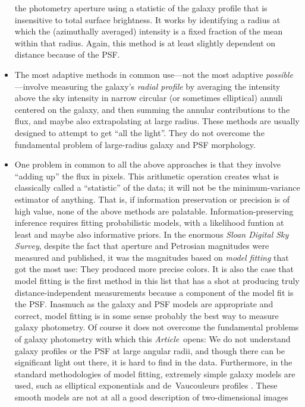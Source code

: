 \documentclass[12pt,preprint,pdftex]{aastex}
\newcommand{\project}[1]{\textsl{#1}}
\newcommand{\documentname}{\textsl{Article}}
\begin{document}
\begin{itemize}
  the photometry aperture using a statistic of the galaxy profile that
  is insensitive to total surface brightness.  It works by identifying
  a radius at which the (azimuthally averaged) intensity is a fixed
  fraction of the mean within that radius.  Again, this method is at
  least slightly dependent on distance because of the PSF.
\item The most adaptive methods in common use---not the most adaptive
  \emph{possible}---involve measuring the galaxy's \emph{radial
    profile} by averaging the intensity above the sky intensity in
  narrow circular (or sometimes elliptical) annuli centered on the
  galaxy, and then summing the annular contributions to the flux, and
  maybe also extrapolating at large radius.  These methods are usually
  designed to attempt to get ``all the light''.  They do not overcome
  the fundamental problem of large-radius galaxy and PSF morphology.
\item One problem in common to all the above approaches is that they
  involve ``adding up'' the flux in pixels.  This arithmetic operation
  creates what is classically called a ``statistic'' of the data; it
  will not be the minimum-variance estimator of anything.  That is, if
  information preservation or precision is of high value, none of the
  above methods are palatable.  Information-preserving inference
  requires fitting probabilistic models, with a likelihood funtion at
  least and maybe also informative priors.  In the enormous
  \project{Sloan Digital Sky Survey}, despite the fact that aperture
  and Petrosian magnitudes were measured and published, it was the
  magnitudes based on \emph{model fitting} that got the most use: They
  produced more precise colors.  It is also the case that model
  fitting is the first method in this list that has a shot at
  producing truly distance-independent measurements because a
  component of the model fit is the PSF.  Inasmuch as the galaxy and
  PSF models are appropriate and correct, model fitting is in some
  sense probably the best way to measure galaxy photometry.  Of course
  it does not overcome the fundamental problems of galaxy photometry
  with which this \documentname\ opens: We do not understand galaxy
  profiles or the PSF at large angular radii, and though there can be
  significant light out there, it is hard to find in the data.
  Furthermore, in the standard methodologies of model fitting,
  extremely simple galaxy models are used, such as elliptical
  exponentials and de~Vaucouleurs profiles \citep{dev}.  These smooth
  models are not at all a good description of two-dimensional images

\end{itemize}
\end{document}
